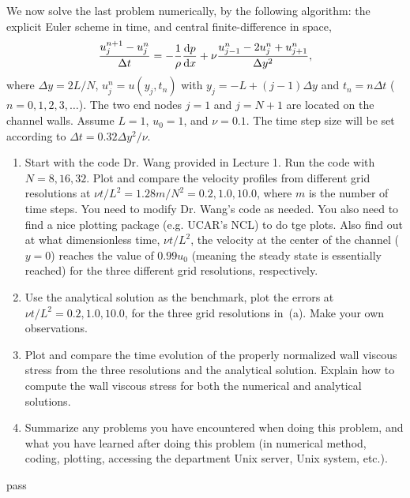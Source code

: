 \begin{homework}[label={H:2-2}]
    We now solve the last problem numerically, by the following algorithm: the explicit Euler scheme in time, and central finite-difference in space,
    \begin{equation}\label{E:2-2-1}
        \frac{u^{n+1}_j-u^n_j}{\Delta t}
        =
        -\frac{1}{\rho}\dv{p}{x} + \nu\frac{u^n_{j-1}-2u^n_j+u^n_{j+1}}{\Delta y^2},
    \end{equation}
    where $\Delta y=2L/N$, $u^n_j=u(y_j, t_n)$ with $y_j=-L+(j-1)\Delta y$ and $t_n=n\Delta t$ ($n=0, 1, 2, 3, \ldots$). The two end nodes $j=1$ and $j=N+1$ are located on the channel walls. Assume $L=1$, $u_0=1$, and $\nu=0.1$. The time step size will be set according to $\Delta t=0.32\Delta y^2/\nu$.

    \begin{enumerate}[label=(\alph*)]
        \item Start with the code Dr. Wang provided in Lecture 1. Run the code with $N=8, 16, 32$.  Plot and compare the velocity profiles from different grid resolutions at $\nu t/L^2=1.28m/N^2=0.2, 1.0, 10.0$, where $m$ is the number of time steps. You need to modify Dr. Wang's code as needed. You also need to find a nice plotting package (e.g. UCAR's NCL) to do tge plots. Also find out at what dimensionless time, $\nu t/L^2$, the velocity at the center of the channel ($y=0$) reaches the value of $0.99u_0$ (meaning the steady state is essentially reached) for the three different grid resolutions, respectively.
        \item Use the analytical solution as the benchmark, plot the errors at $\nu t/L^2=0.2, 1.0, 10.0$, for the three grid resolutions in~(a). Make your own observations.
        \item Plot and compare the time evolution of the properly normalized wall viscous stress from the three resolutions and the analytical solution. Explain how to compute the wall viscous stress for both the numerical and analytical solutions.
        \item Summarize any problems you have encountered when doing this problem, and what you have learned after doing this problem (in numerical method, coding, plotting, accessing the department Unix server, Unix system, etc.).
    \end{enumerate}
\end{homework}

pass



